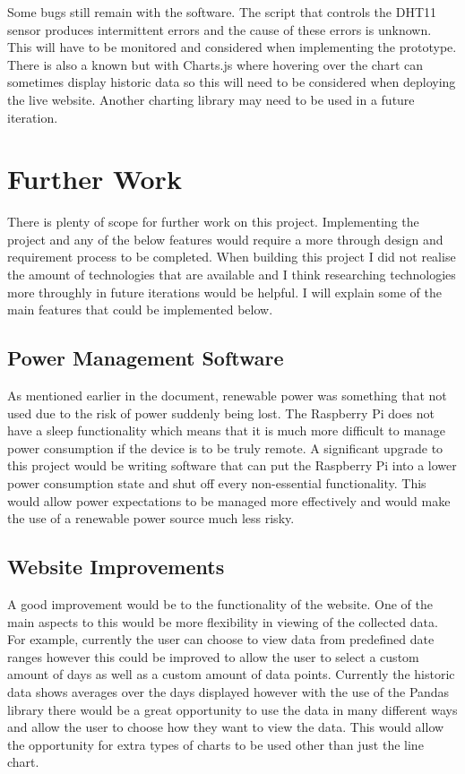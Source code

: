 \documentclass[10pt,a4paper]{article}
\begin{document}
Some bugs still remain with the software. The script that controls the DHT11 sensor produces intermittent errors and the cause of these errors is unknown. This will have to be monitored and considered when implementing the prototype. There is also a known but with Charts.js where hovering over the chart can sometimes display historic data so this will need to be considered when deploying the live website. Another charting library may need to be used in a future iteration. 

\pagebreak
\section{Further Work}
There is plenty of scope for further work on this project. Implementing the project and any of the below features would require a more through design and requirement process to be completed. When building this project I did not realise the amount of technologies that are available and I think researching technologies more throughly in future iterations would be helpful. I will explain some of the main features that could be implemented below.

\subsection{Power Management Software}
As mentioned earlier in the document, renewable power was something that not used due to the risk of power suddenly being lost. The Raspberry Pi does not have a sleep functionality which means that it is much more difficult to manage power consumption if the device is to be truly remote. A significant upgrade to this project would be writing software that can put the Raspberry Pi into a lower power consumption state and shut off every non-essential functionality. This would allow power expectations to be managed more effectively and would make the use of a renewable power source much less risky. 

\subsection{Website Improvements}
A good improvement would be to the functionality of the website. One of the main aspects to this would be more flexibility in viewing of the collected data. For example, currently the user can choose to view data from predefined date ranges however this could be improved to allow the user to select a custom amount of days as well as a custom amount of data points. Currently the historic data shows averages over the days displayed however with the use of the Pandas library there would be a great opportunity to use the data in many different ways and allow the user to choose how they want to view the data. This would allow the opportunity for extra types of charts to be used other than just the line chart. 
\end{document}
